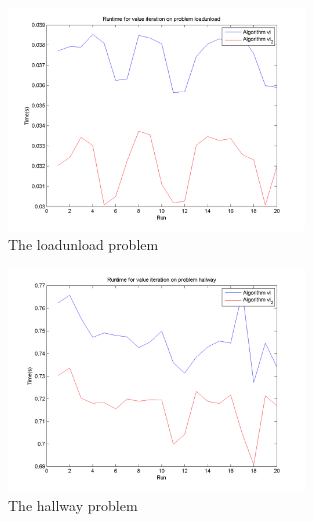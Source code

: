 \documentclass[10pt,a4paper]{article}
\begin{document}

\begin{figure}
\vspace{-20pt}
\hspace{-30pt}
\centering
\includegraphics[width=0.7\textwidth]{Timings/loadunload/timings_vi.png}
\hspace{-30pt}
\caption{The loadunload problem}
\label{fig:vi_loadunload}
\vspace{-20pt}
\end{figure}

\begin{figure}
\vspace{-20pt}
\hspace{-30pt}
\centering
\includegraphics[width=0.7\textwidth]{Timings/hallway/timings_vi.png}
\caption{The hallway problem}
\hspace{-30pt}
\label{fig:vi_hallway}
\vspace{-20pt}
\end{figure}
        
\end{document}
